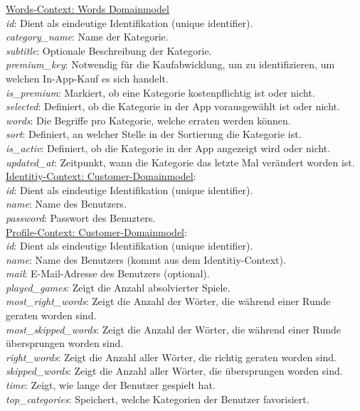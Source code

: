{\underline{Words-Context: Words Domainmodel}\\
\textit{id}: Dient als eindeutige Identifikation (unique identifier).\\
\textit{category\_name}: Name der Kategorie.\\
\textit{subtitle}: Optionale Beschreibung der Kategorie.\\
\textit{premium\_key}: Notwendig für die Kaufabwicklung, um zu identifizieren, um welchen In-App-Kauf es sich handelt.\\
\textit{is\_premium}: Markiert, ob eine Kategorie kostenpflichtig ist oder nicht.\\
\textit{selected}: Definiert, ob die Kategorie in der App vorausgewählt ist oder nicht.\\
\textit{words}: Die Begriffe pro Kategorie, welche erraten werden können.\\
\textit{sort}: Definiert, an welcher Stelle in der Sortierung die Kategorie ist.\\
\textit{is\_activ}: Definiert, ob die Kategorie in der App angezeigt wird oder nicht.\\
\textit{updated\_at}: Zeitpunkt, wann die Kategorie das letzte Mal verändert worden ist.\\

\underline{Identitiy-Context: Customer-Domainmodel}:\\
\textit{id}: Dient als eindeutige Identifikation (unique identifier).\\
\textit{name}: Name des Benutzers.\\
\textit{password}: Passwort des Benuzters.\\

\underline{Profile-Context: Customer-Domainmodel}:\\
\textit{id}: Dient als eindeutige Identifikation (unique identifier).\\
\textit{name}: Name des Benutzers (kommt aus dem Identitiy-Context).\\
\textit{mail}: E-Mail-Adresse des Benutzers (optional).\\
\textit{played\_games}: Zeigt die Anzahl absolvierter Spiele.\\
\textit{most\_right\_words}: Zeigt die Anzahl der Wörter, die während einer Runde geraten worden sind.\\
\textit{most\_skipped\_words}: Zeigt die Anzahl der Wörter, die während einer Runde übersprungen worden sind.\\
\textit{right\_words}: Zeigt die Anzahl aller Wörter, die richtig geraten worden sind.\\
\textit{skipped\_words}: Zeigt die Anzahl aller Wörter, die übersprungen worden sind.\\
\textit{time}: Zeigt, wie lange der Benutzer gespielt hat.\\
\textit{top\_categories}: Speichert, welche Kategorien der Benutzer favorisiert.\\

}
